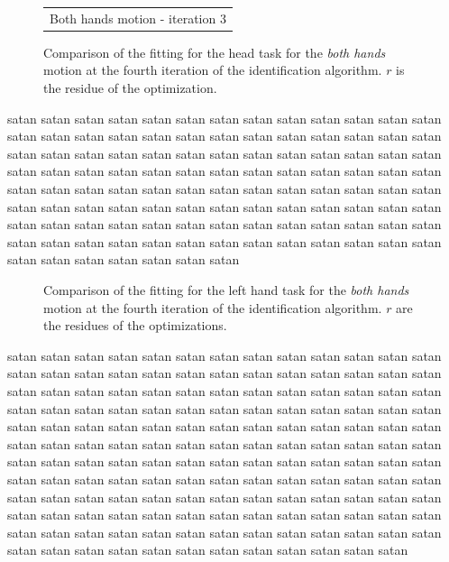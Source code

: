 \documentclass[letterpaper, 10pt, conference]{ieeeconf}      %
\begin{document}
\begin{figure}[t]
  \resizebox{.48\textwidth}{!} {
  \begin{tabular}{c}
	\\
  Both hands motion - iteration 3
  \end{tabular}
    }
\caption{Comparison of the fitting for the head task for the \emph{both hands} motion at the fourth iteration of the identification algorithm.
$r$ is the residue of the optimization.}
\label{fig:exp1:taskHead3}
\end{figure}

satan
satan satan satan satan satan satan satan satan satan satan satan
satan satan satan satan satan satan satan satan satan satan satan
satan satan satan satan satan satan satan satan satan satan satan
satan satan satan satan satan satan satan satan satan satan satan
satan satan satan satan satan satan satan satan satan satan satan
satan satan satan satan satan satan satan satan satan satan satan
satan satan satan satan satan satan satan satan satan satan satan
satan satan satan satan satan satan satan satan satan satan satan
satan satan satan satan satan satan satan satan satan satan satan
satan satan satan satan satan satan satan satan satan satan satan

\begin{figure}[t]
  \centering
\caption{Comparison of the fitting for the left hand task for the \emph{both hands} motion at the fourth iteration of the identification algorithm.
$r$ are the residues of the optimizations.}
\label{fig:exp1:taskLhand3}
\end{figure}

satan
satan satan satan satan satan satan satan satan satan satan satan
satan satan satan satan satan satan satan satan satan satan satan
satan satan satan satan satan satan satan satan satan satan satan
satan satan satan satan satan satan satan satan satan satan satan
satan satan satan satan satan satan satan satan satan satan satan
satan satan satan satan satan satan satan satan satan satan satan
satan satan satan satan satan satan satan satan satan satan satan
satan satan satan satan satan satan satan satan satan satan satan
satan satan satan satan satan satan satan satan satan satan satan
satan satan satan satan satan satan satan satan satan satan satan
satan satan satan satan satan satan satan satan satan satan satan
satan satan satan satan satan satan satan satan satan satan satan
satan satan satan satan satan satan satan satan satan satan satan
satan satan satan satan satan satan satan satan satan satan satan
\end{document}
